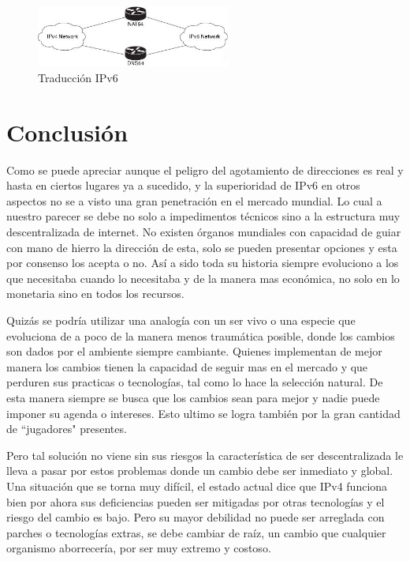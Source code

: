 \documentclass[11pt,a4paper]{article}
\begin{document}
\begin{figure}[h!]
 \centering
 \includegraphics[width=0.57\textwidth]{ipv6_translation.jpg}
 \caption[Traducción IPv6]{Traducción IPv6}
 \label{fig:IPv6_traduc}
\end{figure}

\section{Conclusión}
Como se puede apreciar aunque el peligro del agotamiento de direcciones es real y hasta en ciertos 
lugares ya a sucedido, y la superioridad de IPv6 en otros aspectos no se a visto una gran 
penetración en el mercado mundial. Lo cual a nuestro parecer se debe no solo a impedimentos técnicos 
sino a la estructura muy descentralizada de internet. No existen órganos mundiales con capacidad de 
guiar con mano de hierro la dirección de esta, solo se pueden presentar opciones y esta por consenso 
los acepta o no. Así a sido toda su historia siempre evoluciono a los que necesitaba cuando lo 
necesitaba y de la manera mas económica, no solo en lo monetaria sino en todos los recursos.\par
Quizás se podría utilizar una analogía con un ser vivo o una especie que evoluciona de a poco de la 
manera menos traumática posible, donde los cambios son dados por el ambiente siempre cambiante. 
Quienes implementan de mejor manera los cambios tienen la capacidad de seguir mas en el mercado y 
que perduren sus practicas o tecnologías, tal como lo hace la selección natural. De esta manera 
siempre se busca que los cambios sean para mejor y nadie puede imponer su agenda o intereses. Esto
ultimo se logra también por la gran cantidad de ``jugadores" presentes.\par
Pero tal solución no viene sin sus riesgos la característica de ser descentralizada le lleva a pasar
por estos problemas donde un cambio debe ser inmediato y global. Una situación que se torna muy 
difícil, el estado actual dice que IPv4 funciona bien por ahora sus deficiencias pueden ser 
mitigadas por otras tecnologías y el riesgo del cambio es bajo. Pero su mayor debilidad no puede ser 
arreglada con parches o tecnologías extras, se debe cambiar de raíz, un cambio que cualquier 
organismo aborrecería, por ser muy extremo y costoso.\par
\end{document}
